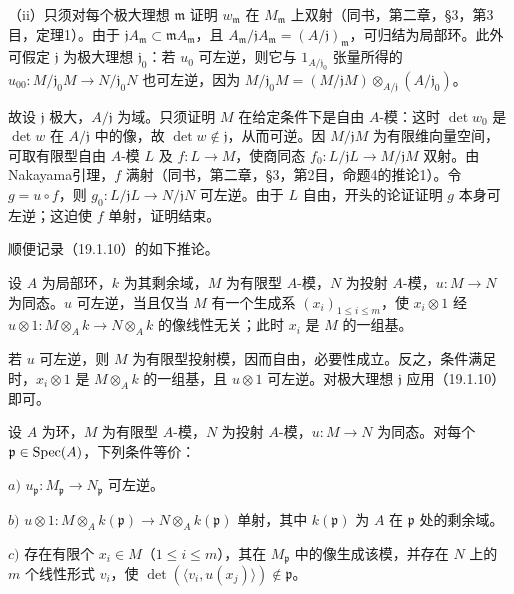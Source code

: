 （ii）只须对每个极大理想 $\mathfrak m$ 证明 $w_{\mathfrak m}$ 在 $M_{\mathfrak m}$ 上双射（同书，第二章，§3，第3目，定理1）。由于 $\mathfrak jA_{\mathfrak m}\subset\mathfrak mA_{\mathfrak m}$，且 $A_{\mathfrak m}/\mathfrak jA_{\mathfrak m}=(A/\mathfrak j)_{\mathfrak m}$，可归结为局部环。此外可假定 $\mathfrak j$ 为极大理想 $\mathfrak j_0$：若 $u_0$ 可左逆，则它与 $1_{A/\mathfrak j_0}$ 张量所得的 $u_{00}:M/\mathfrak j_0M\to N/\mathfrak j_0N$ 也可左逆，因为 $M/\mathfrak j_0M=(M/\mathfrak jM)\otimes_{A/\mathfrak j}(A/\mathfrak j_0)$。

故设 $\mathfrak j$ 极大，$A/\mathfrak j$ 为域。只须证明 $M$ 在给定条件下是自由 $A$-模：这时 $\det w_0$ 是 $\det w$ 在 $A/\mathfrak j$ 中的像，故 $\det w\notin\mathfrak j$，从而可逆。因 $M/\mathfrak jM$ 为有限维向量空间，可取有限型自由 $A$-模 $L$ 及 $f:L\to M$，使商同态 $f_0:L/\mathfrak jL\to M/\mathfrak jM$ 双射。由Nakayama引理，$f$ 满射（同书，第二章，§3，第2目，命题4的推论1）。令 $g=u\circ f$，则 $g_0:L/\mathfrak jL\to N/\mathfrak jN$ 可左逆。由于 $L$ 自由，开头的论证证明 $g$ 本身可左逆；这迫使 $f$ 单射，证明结束。

顺便记录（19.1.10）的如下推论。

设 $A$ 为局部环，$k$ 为其剩余域，$M$ 为有限型 $A$-模，$N$ 为投射 $A$-模，$u:M\to N$ 为同态。$u$ 可左逆，当且仅当 $M$ 有一个生成系 $(x_i)_{1\leq i\leq m}$，使 $x_i\otimes1$ 经 $u\otimes1:M\otimes_Ak\to N\otimes_Ak$ 的像线性无关；此时 $x_i$ 是 $M$ 的一组基。

若 $u$ 可左逆，则 $M$ 为有限型投射模，因而自由，必要性成立。反之，条件满足时，$x_i\otimes1$ 是 $M\otimes_Ak$ 的一组基，且 $u\otimes1$ 可左逆。对极大理想 $\mathfrak j$ 应用（19.1.10）即可。

设 $A$ 为环，$M$ 为有限型 $A$-模，$N$ 为投射 $A$-模，$u:M\to N$ 为同态。对每个 $\mathfrak p\in\operatorname{Spec}(A)$，下列条件等价：

$a)$ $u_{\mathfrak p}:M_{\mathfrak p}\to N_{\mathfrak p}$ 可左逆。

$b)$ $u\otimes1:M\otimes_Ak(\mathfrak p)\to N\otimes_Ak(\mathfrak p)$ 单射，其中 $k(\mathfrak p)$ 为 $A$ 在 $\mathfrak p$ 处的剩余域。

$c)$ 存在有限个 $x_i\in M$（$1\leq i\leq m$），其在 $M_{\mathfrak p}$ 中的像生成该模，并存在 $N$ 上的 $m$ 个线性形式 $v_i$，使
$\det(\langle v_i,u(x_j)\rangle)\notin\mathfrak p$。

